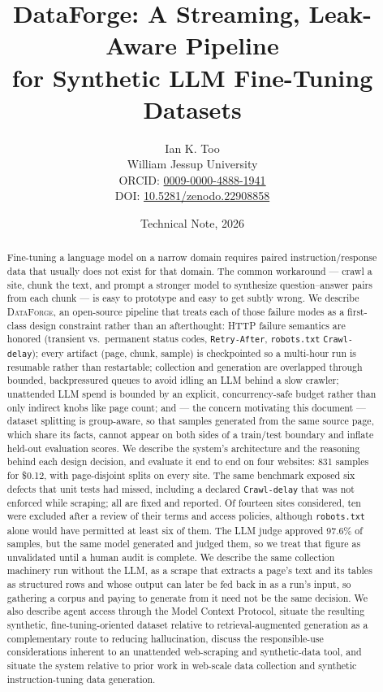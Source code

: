 \documentclass[11pt]{article}
\title{DataForge: A Streaming, Leak-Aware Pipeline\\
for Synthetic LLM Fine-Tuning Datasets}
\author{Ian K. Too\\
  \small William Jessup University\\
  \small ORCID: \href{https://orcid.org/0009-0000-4888-1941}{0009-0000-4888-1941}\\
  \small DOI: \href{https://doi.org/10.5281/zenodo.22908858}{10.5281/zenodo.22908858}}
\date{Technical Note, 2026}
\begin{document}
\maketitle

\begin{abstract}
Fine-tuning a language model on a narrow domain requires paired
instruction/response data that usually does not exist for that domain.
The common workaround --- crawl a site, chunk the text, and prompt a
stronger model to synthesize question--answer pairs from each chunk ---
is easy to prototype and easy to get subtly wrong. We describe
\textsc{DataForge}, an open-source pipeline that treats each of those
failure modes as a first-class design constraint rather than an
afterthought: HTTP failure semantics are honored (transient vs.\
permanent status codes, \texttt{Retry-After}, \texttt{robots.txt}
\texttt{Crawl-delay}); every artifact (page, chunk, sample) is
checkpointed so a multi-hour run is resumable rather than restartable;
collection and generation are overlapped through bounded, backpressured
queues to avoid idling an LLM behind a slow crawler; unattended LLM spend
is bounded by an explicit, concurrency-safe budget rather than only
indirect knobs like page count; and --- the concern motivating this
document --- dataset splitting is group-aware, so that samples generated
from the same source page, which share its facts, cannot appear on both
sides of a train/test boundary and inflate held-out evaluation scores. We describe the system's architecture and the reasoning behind
each design decision, and evaluate it end to end on four websites: 831
samples for \$0.12, with page-disjoint splits on every site. The same
benchmark exposed six defects that unit tests had missed, including a
declared \texttt{Crawl-delay} that was not enforced while scraping; all
are fixed and reported. Of fourteen sites considered, ten were excluded
after a review of their terms and access policies, although
\texttt{robots.txt} alone would have permitted at least six of them. The
LLM judge approved 97.6\% of samples, but the same model generated and
judged them, so we treat that figure as unvalidated until a human audit is
complete. We describe the same collection machinery run without the LLM,
as a scrape that extracts a page's text and its tables as structured rows
and whose output can later be fed back in as a run's input, so gathering
a corpus and paying to generate from it need not be the same decision. We
also describe agent access through the Model Context Protocol, situate
the resulting synthetic, fine-tuning-oriented dataset relative to
retrieval-augmented generation as a complementary
route to reducing hallucination, discuss the responsible-use
considerations inherent to an unattended web-scraping and synthetic-data
tool, and situate the system relative to prior work in web-scale data
collection and synthetic instruction-tuning data generation.
\end{abstract}
\end{document}
